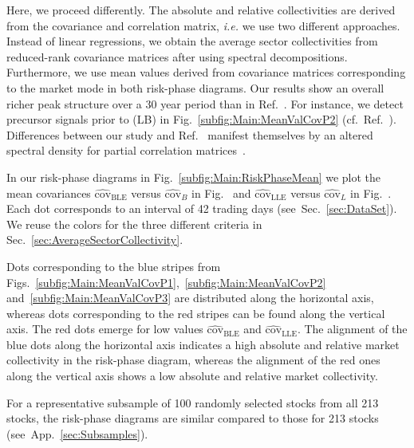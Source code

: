 \documentclass[aps, pra, groupedaddress, showkeys, twocolumn, floatfix, 10pt]{revtex4-2}
\newcommand*\meanNONDiag[1]{\widehat{#1}}
\begin{document}
Here, we proceed differently. The absolute and relative collectivities are derived from the covariance and correlation matrix, \textit{i.e.} we use two different approaches.
Instead of linear regressions, we obtain the average sector collectivities from reduced-rank covariance matrices after using spectral decompositions.
Furthermore, we use mean values derived from covariance matrices corresponding to the market mode in both risk-phase diagrams.
Our results show an overall richer peak structure over a 30 year period than in Ref.~\cite{kenett2011index}. For instance, we detect precursor signals prior to (LB) in Fig.~\ref{subfig:Main:MeanValCovP2} (cf.~Ref.~\cite{Heckens_2022}).
Differences between our study and Ref.~\cite{kenett2011index} manifest themselves by an altered spectral density for partial correlation matrices~\cite{kenett2009rmt}.


In our risk-phase diagrams in Fig.~\ref{subfig:Main:RiskPhaseMean} we plot the mean covariances 
$\meanNONDiag{\text{cov}}_{\text{BLE}}$ versus $\meanNONDiag{\text{cov}}_{{B}}$ in Fig.~ and $\meanNONDiag{\text{cov}}_{\text{LLE}}$ versus $\meanNONDiag{\text{cov}}_{{L}}$ in Fig.~.
Each dot corresponds to an interval of 42 trading days  (see~Sec.~\ref{sec:DataSet}).
We reuse the colors for the three different criteria in Sec.~\ref{sec:AverageSectorCollectivity}.

Dots corresponding to the blue stripes from Figs.~\ref{subfig:Main:MeanValCovP1},~\ref{subfig:Main:MeanValCovP2} and~\ref{subfig:Main:MeanValCovP3}
are distributed along the horizontal axis, whereas dots corresponding to the red stripes can be found along the vertical axis.
The red dots emerge for low values $\meanNONDiag{\text{cov}}_{\text{BLE}}$ and $\meanNONDiag{\text{cov}}_{\text{LLE}}$.
The alignment of the blue dots along the horizontal axis indicates a high absolute and relative market collectivity in the risk-phase diagram, whereas the alignment of the red ones along the vertical axis shows a low absolute and relative market collectivity. 


For a representative subsample of 100 randomly selected stocks from all 213 stocks, the risk-phase diagrams are similar compared to those for 213 stocks (see~App.~\ref{sec:Subsamples}).
\end{document}

